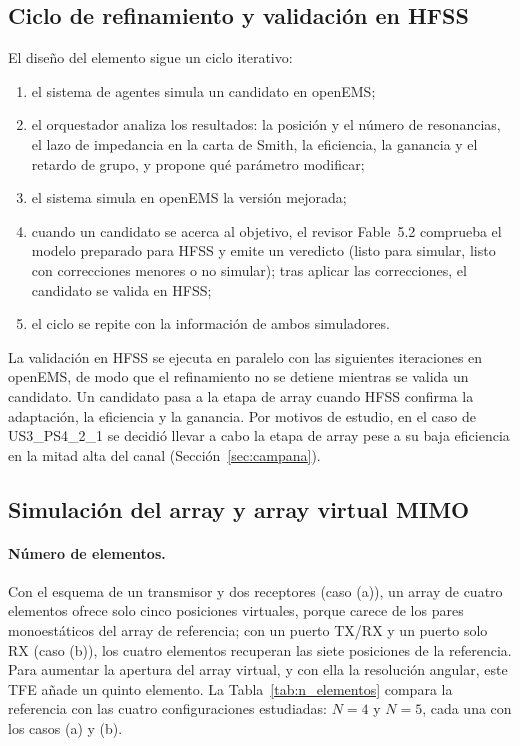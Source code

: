 \documentclass[11pt,a4paper]{article}
\begin{document}
\subsection{Ciclo de refinamiento y validación en HFSS}\label{sec:ciclo}
El diseño del elemento sigue un ciclo iterativo:
\begin{enumerate}
    \item el sistema de agentes simula un candidato en openEMS;
    \item el orquestador analiza los resultados: la posición y el número de
    resonancias, el lazo de impedancia en la carta de Smith, la eficiencia, la ganancia y el
    retardo de grupo, y propone qué parámetro modificar;
    \item el sistema simula en openEMS la versión mejorada;
    \item cuando un candidato se acerca al objetivo, el revisor Fable~5.2 comprueba el modelo
    preparado para HFSS y emite un veredicto (listo para simular, listo con correcciones menores
    o no simular); tras aplicar las correcciones, el candidato se valida en HFSS;
    \item el ciclo se repite con la información de ambos simuladores.
\end{enumerate}
La validación en HFSS se ejecuta en paralelo con las siguientes iteraciones en openEMS, de modo
que el refinamiento no se detiene mientras se valida un candidato. Un candidato pasa a la etapa
de array cuando HFSS confirma la adaptación, la eficiencia y la ganancia. Por motivos de estudio, en el caso de
US3\_PS4\_2\_1 se decidió llevar a cabo la etapa de array pese a su baja eficiencia en la mitad alta
del canal (Sección~\ref{sec:campana}).

\subsection{Simulación del array y array virtual MIMO}\label{sec:array_mimo}
\paragraph{Número de elementos.} Con el esquema de un transmisor y dos receptores (caso (a)), un array de
cuatro elementos ofrece solo cinco posiciones virtuales, porque carece de los pares monoestáticos
del array de referencia; con un puerto TX/RX y un puerto solo RX (caso (b)), los cuatro elementos
recuperan las siete posiciones de la referencia. Para aumentar la apertura del array virtual, y con ella la resolución
angular, este TFE añade un quinto elemento. La Tabla~\ref{tab:n_elementos} compara la referencia con las cuatro
configuraciones estudiadas: $N = 4$ y $N = 5$, cada una con los casos (a) y (b).
\end{document}

